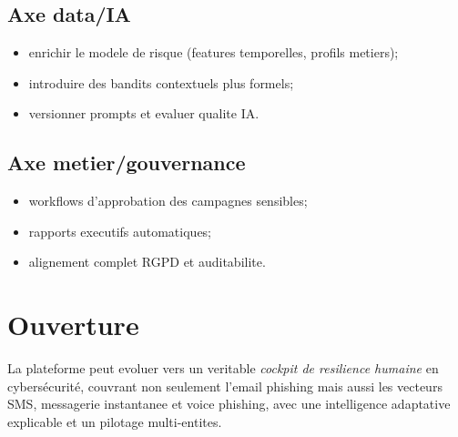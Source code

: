 \documentclass[12pt,a4paper,oneside]{report}
\begin{document}
\subsection{Axe data/IA}
\begin{itemize}[leftmargin=1.2cm]
  \item enrichir le modele de risque (features temporelles, profils metiers);
  \item introduire des bandits contextuels plus formels;
  \item versionner prompts et evaluer qualite IA.
\end{itemize}

\subsection{Axe metier/gouvernance}
\begin{itemize}[leftmargin=1.2cm]
  \item workflows d'approbation des campagnes sensibles;
  \item rapports executifs automatiques;
  \item alignement complet RGPD et auditabilite.
\end{itemize}

\section{Ouverture}
La plateforme peut evoluer vers un veritable \textit{cockpit de resilience humaine} en cybersécurité, couvrant non seulement l'email phishing mais aussi les vecteurs SMS, messagerie instantanee et voice phishing, avec une intelligence adaptative explicable et un pilotage multi-entites.

\appendix
\end{document}
